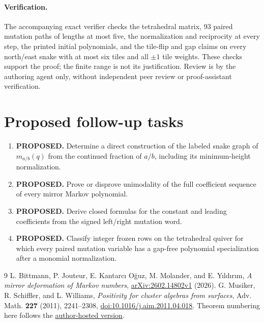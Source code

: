 \documentclass[11pt]{article}
\begin{document}
\paragraph{Verification.}
The accompanying exact verifier checks the tetrahedral matrix, 93 paired
mutation paths of lengths at most five, the normalization and reciprocity at
every step, the printed initial polynomials, and the tile-flip and gap claims
on every north/east snake with at most six tiles and all $\pm1$ tile weights.
These checks support the proof; the finite range is not its justification.
Review is by the authoring agent only, without independent peer review or
proof-assistant verification.

\section*{Proposed follow-up tasks}
\begin{enumerate}[label=Task \arabic*:,start=2,leftmargin=*]
\item \textbf{PROPOSED.} Determine a direct construction of the labeled snake
graph of $m_{a/b}(q)$ from the continued fraction of $a/b$, including its
minimum-height normalization.
\item \textbf{PROPOSED.} Prove or disprove unimodality of the full coefficient
sequence of every mirror Markov polynomial.
\item \textbf{PROPOSED.} Derive closed formulas for the constant and leading
coefficients from the signed left/right mutation word.
\item \textbf{PROPOSED.} Classify integer frozen rows on the tetrahedral quiver
for which every paired mutation variable has a gap-free polynomial
specialization after a monomial normalization.
\end{enumerate}

\begin{thebibliography}{9}
 L. Bittmann, P. Jouteur, E. Kantarc\i{} O\u{g}uz,
M. Molander, and E. Y\i{}ld\i{}r\i{}m,
\emph{A mirror deformation of Markov numbers},
\href{https://arxiv.org/abs/2602.14802}{arXiv:2602.14802v1} (2026).
 G. Musiker, R. Schiffler, and L. Williams,
\emph{Positivity for cluster algebras from surfaces},
Adv. Math. \textbf{227} (2011), 2241--2308,
\href{https://doi.org/10.1016/j.aim.2011.04.018}{doi:10.1016/j.aim.2011.04.018}.
Theorem numbering here follows the
\href{https://people.math.harvard.edu/~williams/papers/MSW-July24v5.pdf}{author-hosted version}.
\end{thebibliography}
\end{document}
